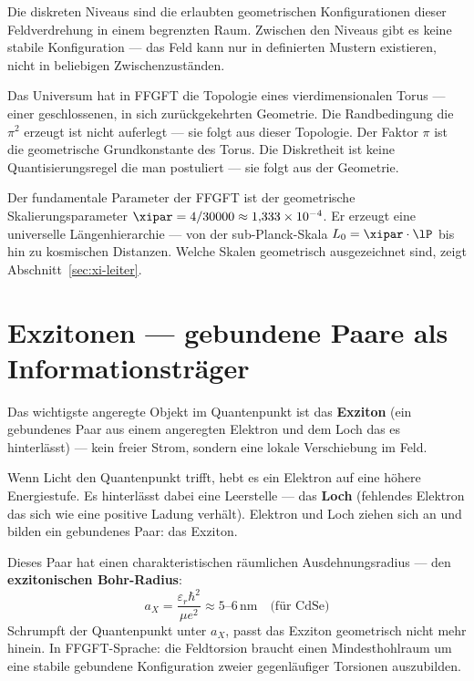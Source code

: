 Die diskreten Niveaus sind die erlaubten geometrischen
Konfigurationen dieser Feldverdrehung in einem begrenzten Raum.
Zwischen den Niveaus gibt es keine stabile Konfiguration ---
das Feld kann nur in definierten Mustern existieren,
nicht in beliebigen Zwischenzuständen.

\begin{foundation}
Das Universum hat in FFGFT die Topologie eines vierdimensionalen Torus ---
einer geschlossenen, in sich zurückgekehrten Geometrie.
Die Randbedingung die $\pi^2$ erzeugt ist nicht auferlegt ---
sie folgt aus dieser Topologie. Der Faktor $\pi$ ist die
geometrische Grundkonstante des Torus. Die Diskretheit ist
keine Quantisierungsregel die man postuliert --- sie folgt
aus der Geometrie.

Der fundamentale Parameter der FFGFT ist der geometrische
Skalierungsparameter $\xipar = 4/30000 \approx 1{,}333 \times 10^{-4}$.
Er erzeugt eine universelle Längenhierarchie --- von der
sub-Planck-Skala $L_0 = \xipar \cdot \lP$ bis hin zu kosmischen Distanzen.
Welche Skalen geometrisch ausgezeichnet sind, zeigt
Abschnitt~\ref{sec:xi-leiter}.
\end{foundation}

\section{Exzitonen --- gebundene Paare als Informationsträger}
\label{sec:exzitonen}

Das wichtigste angeregte Objekt im Quantenpunkt ist das
\textbf{Exziton} (ein gebundenes Paar aus einem angeregten
Elektron und dem Loch das es hinterlässt) ---
kein freier Strom, sondern eine lokale Verschiebung im Feld.

Wenn Licht den Quantenpunkt trifft, hebt es ein Elektron
auf eine höhere Energiestufe. Es hinterlässt dabei eine
Leerstelle --- das \textbf{Loch} (fehlendes Elektron das sich
wie eine positive Ladung verhält). Elektron und Loch
ziehen sich an und bilden ein gebundenes Paar: das Exziton.

Dieses Paar hat einen charakteristischen räumlichen Ausdehnungsradius
--- den \textbf{exzitonischen Bohr-Radius}:
\begin{equation}
  a_X = \frac{\varepsilon_r \hbar^2}{\mu e^2} \approx 5\text{--}6\,\text{nm}
  \quad \text{(für CdSe)}
\end{equation}
Schrumpft der Quantenpunkt unter $a_X$, passt das Exziton
geometrisch nicht mehr hinein. In FFGFT-Sprache: die Feldtorsion
braucht einen Mindesthohlraum um eine stabile gebundene Konfiguration
zweier gegenläufiger Torsionen auszubilden.

